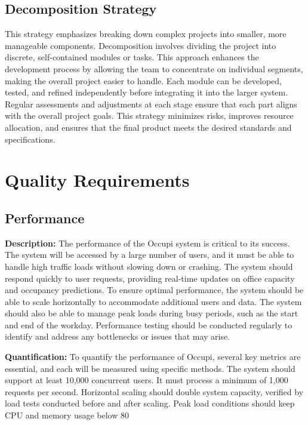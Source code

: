 \documentclass[11pt,a4paper]{article}
\begin{document}
\subsection*{Decomposition Strategy}
This strategy emphasizes breaking down complex projects into smaller, more manageable components. Decomposition involves dividing the project into discrete, self-contained modules or tasks. This approach enhances the development process by allowing the team to concentrate on individual segments, making the overall project easier to handle. Each module can be developed, tested, and refined independently before integrating it into the larger system. Regular assessments and adjustments at each stage ensure that each part aligns with the overall project goals. This strategy minimizes risks, improves resource allocation, and ensures that the final product meets the desired standards and specifications.

\section*{Quality Requirements}

\subsection*{Performance}
\textbf{Description:} The performance of the Occupi system is critical to its success. The system will be accessed by a large number of users, and it must be able to handle high traffic loads without slowing down or crashing. The system should respond quickly to user requests, providing real-time updates on office capacity and occupancy predictions. To ensure optimal performance, the system should be able to scale horizontally to accommodate additional users and data. The system should also be able to manage peak loads during busy periods, such as the start and end of the workday. Performance testing should be conducted regularly to identify and address any bottlenecks or issues that may arise.

\textbf{Quantification:} To quantify the performance of Occupi, several key metrics are essential, and each will be measured using specific methods. The system should support at least 10,000 concurrent users. It must process a minimum of 1,000 requests per second. Horizontal scaling should double system capacity, verified by load tests conducted before and after scaling. Peak load conditions should keep CPU and memory usage below 80%
\end{document}
